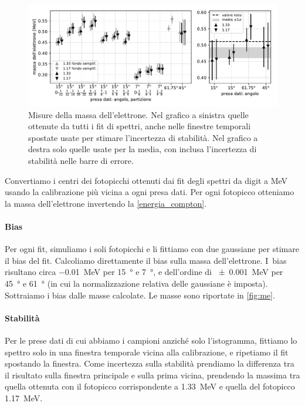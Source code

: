 \begin{figure}
	\hspace{-5em}\includegraphics[width=46em]{me}
	\caption{\label{fig:me}
	Misure della massa dell'elettrone.
	Nel grafico a sinistra quelle ottenute da tutti i fit di spettri,
	anche nelle finestre temporali spostate usate per stimare l'incertezza di stabilità.
	Nel grafico a destra solo quelle usate per la media,
	con inclusa l'incertezza di stabilità nelle barre di errore.}
\end{figure}

Convertiamo i centri dei fotopicchi ottenuti dai fit degli spettri
da digit a MeV usando la calibrazione più vicina a ogni presa dati.
Per ogni fotopicco otteniamo la massa dell'elettrone invertendo la \eqref{energia_compton}.

\paragraph{Bias}

Per ogni fit, simuliamo i soli fotopicchi e li fittiamo con due gaussiane
per stimare il bias del fit. Calcoliamo direttamente il bias sulla massa dell'elettrone.
I~bias risultano circa \SI{-0.01}{MeV} per \SI{15}{\degree} e \SI{7}{\degree},
e dell'ordine di \SI{\pm0.001}{MeV} per \SI{45}{\degree} e \SI{61}{\degree}
(in cui la normalizzazione relativa delle gaussiane è imposta).
Sottraiamo i bias dalle masse calcolate.
Le masse sono riportate in \autoref{fig:me}.

\paragraph{Stabilità}

Per le prese dati di cui abbiamo i campioni anziché solo l'istogramma,
fittiamo lo spettro solo in una finestra temporale vicina alla calibrazione,
e ripetiamo il fit spostando la finestra.
Come incertezza sulla stabilità prendiamo la differenza
tra il risultato sulla finestra principale e sulla prima vicina,
prendendo la massima tra quella ottenuta con il fotopicco corrispondente a \SI{1.33}{MeV}
e quella del fotopicco \SI{1.17}{MeV}.

